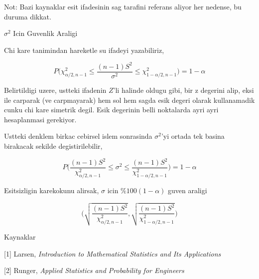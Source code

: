 \documentclass[12pt,fleqn]{article}\usepackage{../common}
\begin{document}
Not: Bazi kaynaklar esit ifadesinin sag tarafini referans aliyor her
nedense, bu duruma dikkat.

$\sigma^2$ Icin Guvenlik Araligi

Chi kare tanimindan hareketle su ifadeyi yazabiliriz, 

$$ P\bigg(
\chi_{\alpha/2,n-1}^2 \le
\frac{(n-1)S^2}{\sigma^2}  \le
\chi_{1-\alpha/2,n-1}^2
\bigg) = 1-\alpha
$$


Belirtildigi uzere, ustteki ifadenin $Z$'li halinde oldugu gibi, bir z
degerini alip, eksi ile carparak (ve carpmayarak) hem sol hem sagda esik
degeri olarak kullanamadik cunku chi kare simetrik degil. Esik degerinin
belli noktalarda ayri ayri hesaplanmasi gerekiyor.

Ustteki denklem birkac cebirsel islem sonrasinda $\sigma^2$'yi ortada tek
basina birakacak sekilde degistirilebilir,

$$
P
\bigg(
\frac{(n-1)S^2}{\chi_{\alpha/2,n-1}^2} \le
\sigma^2  \le
\frac{(n-1)S^2}{\chi_{1-\alpha/2,n-1}^2}
\bigg) = 1-\alpha
$$

Esitsizligin karekokunu alirsak, $\sigma$ icin $\%100(1-\alpha)$ guven
araligi


$$
\bigg(
\sqrt{\frac{(n-1)S^2}{\chi_{\alpha/2,n-1}^2}}
,
\sqrt{\frac{(n-1)S^2}{\chi_{1-\alpha/2,n-1}^2}}
\bigg) 
$$


Kaynaklar

[1] Larsen, {\em Introduction to Mathematical Statistics and Its Applications}

[2] Runger, {\em Applied Statistics and Probability for Engineers}
\end{document}
